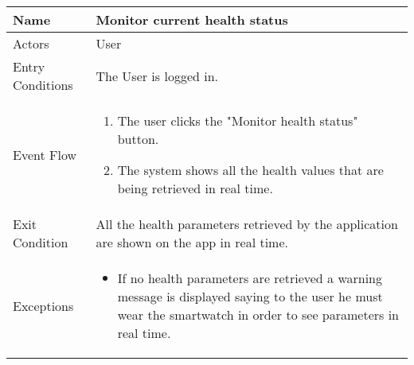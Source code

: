 \begin{table}[h]
\begin{tabular}{|l|l|}
\hline
Name             & Monitor current health status \\ \hline
Actors           & User  \\ \hline
Entry Conditions & The User is logged in. \\ \hline
Event Flow       & \parbox{.45\textwidth}{\begin{enumerate}
            \item The user clicks the "Monitor health status" button.
            \item The system shows all the health values that are being retrieved in real time.
        \end{enumerate}}\\ \hline
Exit Condition   & All the health parameters retrieved by the application are shown on the app in real time.\\ \hline
Exceptions       & \parbox{.45\textwidth}  
{\begin{itemize}
\item If no health parameters are retrieved a warning message is displayed saying to the user he must wear the smartwatch in order to see parameters in real time. \end{itemize}}\\ \hline
\end{tabular}
\end{table}

